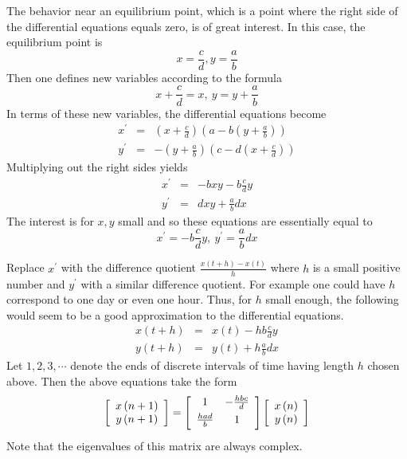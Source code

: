 The behavior near an equilibrium point, which is a point where the right
side of the differential equations equals zero, is of great interest. In
this case, the equilibrium point is
\begin{equation*}
x=\frac{c}{d}, y=\frac{a}{b}
\end{equation*}
Then one defines new variables according to the formula
\begin{equation*}
x+\frac{c}{d}=x,\ y=y+\frac{a}{b}
\end{equation*}
In terms of these new variables, the differential equations become
\begin{eqnarray*}
x^{\prime } &=&\left( x+\frac{c}{d}\right) \left( a-b\left( y+\frac{a}{b}
\right) \right) \\
y^{\prime } &=&-\left( y+\frac{a}{b}\right) \left( c-d\left( x+\frac{c}{d}
\right) \right)
\end{eqnarray*}
Multiplying out the right sides yields
\begin{eqnarray*}
x^{\prime } &=&-bxy-b\frac{c}{d}y \\
y^{\prime } &=&dxy+\frac{a}{b}dx
\end{eqnarray*}
The interest is for $x,y$ small and so these equations are essentially equal
to
\begin{equation*}
x^{\prime }=-b\frac{c}{d}y,\ y^{\prime }=\frac{a}{b}dx
\end{equation*}

Replace $x^{\prime }$ with the difference quotient $\frac{x\left( t+h\right)
-x\left( t\right) }{h}$ where $h$ is a small positive number and $y^{\prime
} $ with a similar difference quotient. For example one could have $h$
correspond to one day or even one hour. Thus, for $h$ small enough, the
following would seem to be a good approximation to the differential
equations.
\begin{eqnarray*}
x\left( t+h\right) &=&x\left( t\right) -hb\frac{c}{d}y \\
y\left( t+h\right) &=&y\left( t\right) +h\frac{a}{b}dx
\end{eqnarray*}
Let $1,2,3,\cdots $ denote the ends of discrete intervals of time having
length $h$ chosen above. Then the above equations take the form
\begin{equation*}
\leftB
\begin{array}{c}
x\left( n+1\right) \\
y\left( n+1\right)
\end{array}
\rightB =\leftB
\begin{array}{cc}
1 & -\vspace{0.05in}\frac{hbc}{d} \\
\vspace{0.05in}\frac{had}{b} & 1
\end{array}
\rightB \leftB
\begin{array}{c}
x\left( n\right) \\
y\left( n\right)
\end{array}
\rightB
\end{equation*}
Note that the eigenvalues of this matrix are always complex.

